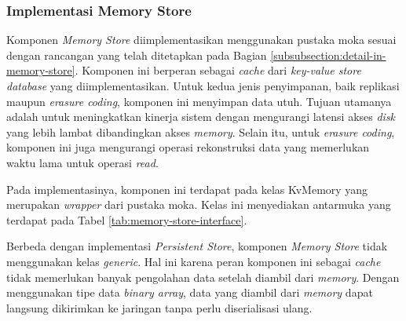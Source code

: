 \subsubsection{Implementasi Memory Store}
\label{subsubsection:implementasi-memory-store}

Komponen \textit{Memory Store} diimplementasikan menggunakan pustaka moka sesuai dengan rancangan yang telah ditetapkan pada Bagian \ref{subsubsection:detail-in-memory-store}. Komponen ini berperan sebagai \textit{cache} dari \textit{key-value store database} yang diimplementasikan. Untuk kedua jenis penyimpanan, baik replikasi maupun \textit{erasure coding}, komponen ini menyimpan data utuh. Tujuan utamanya adalah untuk meningkatkan kinerja sistem dengan mengurangi latensi akses \textit{disk} yang lebih lambat dibandingkan akses \textit{memory}. Selain itu, untuk \textit{erasure coding}, komponen ini juga mengurangi operasi rekonstruksi data yang memerlukan waktu lama untuk operasi \textit{read}.

Pada implementasinya, komponen ini terdapat pada kelas KvMemory yang merupakan \textit{wrapper} dari pustaka moka. Kelas ini menyediakan antarmuka yang terdapat pada Tabel \ref{tab:memory-store-interface}.

\begin{table}[h]
    \centering
    \caption{Antarmuka Persistent Store}
    \label{tab:memory-store-interface}
\end{table}

Berbeda dengan implementasi \textit{Persistent Store}, komponen \textit{Memory Store} tidak menggunakan kelas \textit{generic}. Hal ini karena peran komponen ini sebagai \textit{cache} tidak memerlukan banyak pengolahan data setelah diambil dari \textit{memory}. Dengan menggunakan tipe data \textit{binary array}, data yang diambil dari \textit{memory} dapat langsung dikirimkan ke jaringan tanpa perlu diserialisasi ulang.
